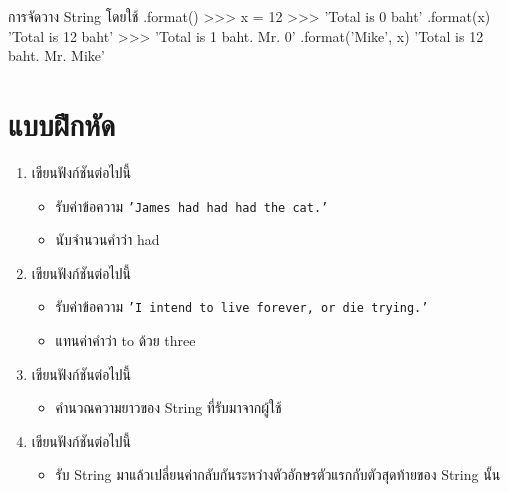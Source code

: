 \begin{codelist}{การจัดวาง String โดยใช้ .format()}{}
>>> x = 12
>>> 'Total is {0} baht' .format(x)
'Total is 12 baht'
>>> 'Total is {1} baht. Mr. {0}' .format('Mike', x)
'Total is 12 baht. Mr. Mike'
\end{codelist}


\section{แบบฝึกหัด}
\begin{enumerate} 
\item 	เขียนฟังก์ชันต่อไปนี้
\begin{itemize}
\item 	รับค่าข้อความ \texttt{'James had had had the cat.'}
\item 	นับจำนวนคำว่า had
\end{itemize}
\item 	เขียนฟังก์ชันต่อไปนี้
\begin{itemize}
\item 	รับค่าข้อความ  \texttt{'I intend to live forever, or die trying.'}
\item 	แทนค่าคำว่า to ด้วย three
\end{itemize}
\item 	เขียนฟังก์ชันต่อไปนี้
\begin{itemize}
\item 	คำนวณความยาวของ String ที่รับมาจากผู้ใช้
\end{itemize}
\item 	เขียนฟังก์ชันต่อไปนี้
\begin{itemize}
\item 	รับ String มาแล้วเปลี่ยนค่ากลับกันระหว่างตัวอักษรตัวแรกกับตัวสุดท้ายของ String นั้น
\end{itemize}
\end{enumerate}


